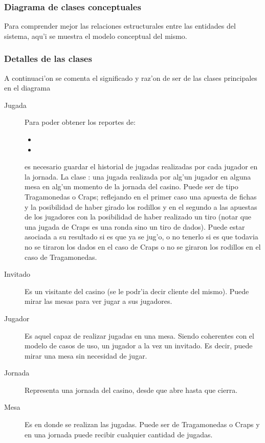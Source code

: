 \subsubsection{Diagrama de clases conceptuales}
Para comprender mejor las relaciones estructurales entre las entidades del sistema, aqu'i se muestra el modelo conceptual del mismo. 



\subsubsection{Detalles de las clases}
A continuaci'on se comenta el significado y raz'on de ser de las clases principales en el diagrama
\begin{description}
\item [Jugada] Para poder obtener los reportes de:
\begin{itemize}
 \item {} 
\item {} 
\end{itemize}
 es necesario guardar el historial de jugadas realizadas por cada jugador en la jornada. 
La clase : una jugada realizada por alg'un jugador en alguna mesa en alg'un momento de la jornada del casino. Puede ser de tipo Tragamonedas o Craps; reflejando en el primer caso una apuesta de fichas y la posibilidad de haber girado los rodillos y en el segundo a las apuestas de los jugadores con la posibilidad de haber realizado un tiro (notar que una jugada de Craps  es una ronda sino un tiro de dados). Puede estar asociada a su resultado si es que ya se jug'o, o no tenerlo si es que todavia no se tiraron los dados en el caso de Craps o no se giraron los rodillos en el caso de Tragamonedas. 

\item [Invitado] Es un visitante del casino (se le podr'ia decir cliente del mismo). Puede mirar las mesas para ver jugar a sus jugadores.
\item [Jugador] Es aquel capaz de realizar jugadas en una mesa. Siendo coherentes con el modelo de casos de uso, un jugador  a la vez un invitado. Es decir, puede mirar una mesa sin necesidad de jugar.
\item [Jornada] Representa una jornada del casino, desde que abre hasta que cierra.
\item [Mesa] Es en donde se realizan las jugadas. Puede ser de Tragamonedas o Craps y en una jornada puede recibir cualquier cantidad de jugadas.
\end{description}


